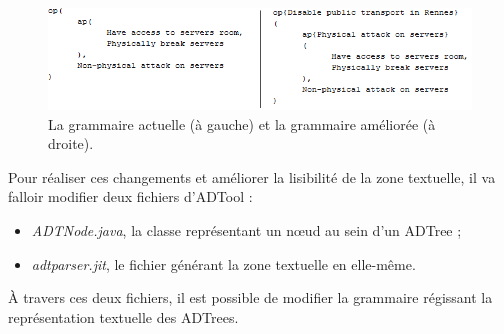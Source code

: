 	    \begin{figure}[H]
	        \centering
	        \includegraphics[width=\textwidth]{figure/grams.png}
	        \caption{La grammaire actuelle (à gauche) et la grammaire améliorée (à droite).}
	        \label{fig:grams}
	    \end{figure}

		Pour réaliser ces changements et améliorer la lisibilité de la zone textuelle, il va falloir modifier deux fichiers d'ADTool :
		\begin{itemize}
		\item \emph{ADTNode.java}, la classe représentant un nœud au sein d'un ADTree ;
		\item \emph{adtparser.jit}, le fichier générant la zone textuelle en elle-même.
		\end{itemize}
		
		À travers ces deux fichiers, il est possible de modifier la grammaire régissant la représentation textuelle des ADTrees.